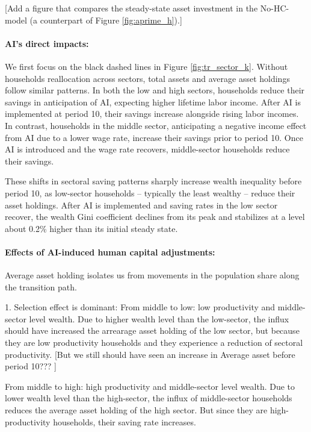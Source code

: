 \documentclass[12pt]{article}
\begin{document}
{\color{red} [Add a figure that compares the steady-state asset investment in the No-HC-model (a counterpart of Figure \ref{fig:aprime_h}).]}

\paragraph{AI's direct impacts:} We first focus on the black dashed lines in Figure \ref{fig:tr_sector_k}. Without households reallocation across sectors, total assets and average asset holdings follow similar patterns. In both the low and high sectors, households reduce their savings in anticipation of AI, expecting higher lifetime labor income. After AI is implemented at period 10, their savings increase alongside rising labor incomes. In contrast, households in the middle sector, anticipating a negative income effect from AI due to a lower wage rate, increase their savings prior to period 10. Once AI is introduced and the wage rate recovers, middle-sector households reduce their savings.

These shifts in sectoral saving patterns sharply increase wealth inequality before period 10, as low-sector households -- typically the least wealthy -- reduce their asset holdings. After AI is implemented and saving rates in the low sector recover, the wealth Gini coefficient declines from its peak and stabilizes at a level about 0.2\% higher than its initial steady state.


\paragraph{Effects of AI-induced human capital adjustments:}
Average asset holding isolates us from movements in the population share along the transition path.

1. Selection effect is dominant:
From middle to low: low productivity and middle-sector level wealth. Due to higher wealth level than the low-sector, the influx should have increased the arrearage asset holding of the low sector, but because they are low productivity households and they experience a reduction of sectoral productivity. [But we still should have seen an increase in Average asset before period 10??? ]


From middle to high: high productivity and middle-sector level wealth. Due to lower wealth level than the high-sector, the influx of middle-sector households reduces the average asset holding of the high sector. But since they are high-productivity households, their saving rate increases.
\end{document}
